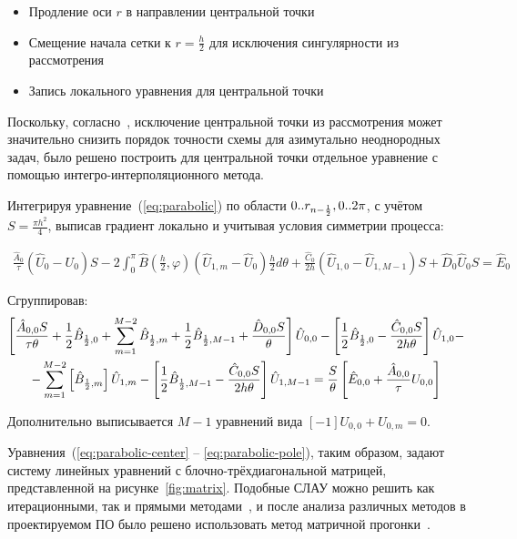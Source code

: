 \begin{itemize}
    \item Продление оси $r$ в направлении центральной точки
    \item Смещение начала сетки к $r = \frac{h}{2}$ для исключения 
    сингулярности из рассмотрения
    \item Запись локального уравнения для центральной точки
\end{itemize}

Поскольку, согласно~\cite{centerPointTreatmentTotal}, исключение центральной 
точки из рассмотрения может значительно снизить порядок точности схемы для 
азимутально неоднородных задач, было решено построить для центральной точки 
отдельное уравнение с помощью интегро-интерполяционного метода.

Интегрируя уравнение~(\ref{eq:parabolic}) по области ${0..r_{n-\frac{1}{2}}, 
0..2\pi}$, с учётом $S = \frac{\pi h^2}{4}$, выписав градиент локально и 
учитывая условия симметрии процесса:

\begin{gather*}
    \frac{\hat{A}_0}{\tau} (\hat{U}_0 - U_0) S
    - 2\int_0^\pi \hat{B}(\frac{h}{2}, \varphi) 
        (\hat{U}_{1,m} - \hat{U}_0) \frac{h}{2} d \theta
    + \frac{\hat{C}_0}{2h} (\hat{U}_{1, 0} - \hat{U}_{1, M-1}) S
    + \hat{D}_0 \hat{U}_0 S = \hat{E}_0
\end{gather*}

Сгруппировав:
\begin{gather}
    \left[ 
        \frac{\hat{A}_{0,0} S}{\tau \theta}
        + \frac{1}{2}\hat{B}_{\frac{1}{2}, 0}
        + \sum_{m=1}^{M-2} \hat{B}_{\frac{1}{2}, m}
        + \frac{1}{2}\hat{B}_{\frac{1}{2}, M-1}
        + \frac{\hat{D}_{0,0} S}{\theta}
    \right] \hat{U}_{0,0}
    -\left[
        \frac{1}{2}\hat{B}_{\frac{1}{2}, 0} - \frac{\hat{C}_{0,0} S}{2 h \theta}
    \right] \hat{U}_{1, 0}
    -\nonumber\\
    -\sum_{m=1}^{M-2} \left[ \hat{B}_{\frac{1}{2}, m} \right] \hat{U}_{1, m}
    -\left[
        \frac{1}{2}\hat{B}_{\frac{1}{2}, M-1} - \frac{\hat{C}_{0,0} S}{2 h \theta}
    \right] \hat{U}_{1, M-1}
    =
    \frac{S}{\theta}
    \left[
        \hat{E}_{0,0}
        + \frac{\hat{A}_{0,0}}{\tau} U_{0,0}
    \right]
    \label{eq:parabolic-pole}
\end{gather}

Дополнительно выписывается $M-1$ уравнений вида $\left[-1\right] U_{0, 0} + 
U_{0, m} = 0$.

Уравнения~(\ref{eq:parabolic-center} -- \ref{eq:parabolic-pole}), таким 
образом, задают систему линейных уравнений с блочно-трёхдиагональной матрицей, 
представленной на рисунке~\ref{fig:matrix}.
Подобные СЛАУ можно решить как итерационными, так и прямыми 
методами~\cite{kalitkin}, и после анализа различных методов в 
проектируемом ПО было решено использовать метод матричной 
прогонки~\cite{SamarskyMesh}.

